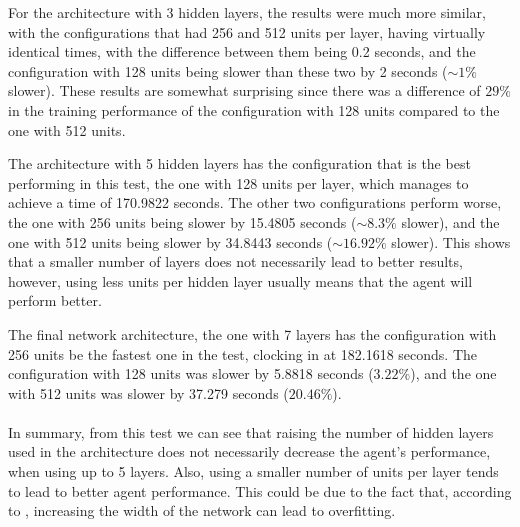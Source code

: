For the architecture with 3 hidden layers, the results were much more similar, with the configurations that had 256 and 512 units per layer, having virtually identical times, with the difference between them being 0.2 seconds, and the configuration with 128 units being slower than these two by 2 seconds ($\sim1\%$ slower). These results are somewhat surprising since there was a difference of $29\%$ in the training performance of the configuration with 128 units compared to the one with 512 units.

The architecture with 5 hidden layers has the configuration that is the best performing in this test, the one with 128 units per layer, which manages to achieve a time of 170.9822 seconds. The other two configurations perform worse, the one with 256 units being slower by 15.4805 seconds ($\sim8.3\%$ slower), and the one with 512 units being slower by 34.8443 seconds ($\sim16.92\%$ slower). This shows that a smaller number of layers does not necessarily lead to better results, however, using less units per hidden layer usually means that the agent will perform better.

The final network architecture, the one with 7 layers has the configuration with 256 units be the fastest one in the test, clocking in at 182.1618 seconds. The configuration with 128 units was slower by 5.8818 seconds ($3.22\%$), and the one with 512 units was slower by 37.279 seconds ($20.46\%$).

\paragraph{}
In summary, from this test we can see that raising the number of hidden layers used in the architecture does not necessarily decrease the agent's performance, when using up to 5 layers. Also, using a smaller number of units per layer tends to lead to better agent performance. This could be due to the fact that, according to \cite{eldan2016powerofdepth}, increasing the width of the network can lead to overfitting.

